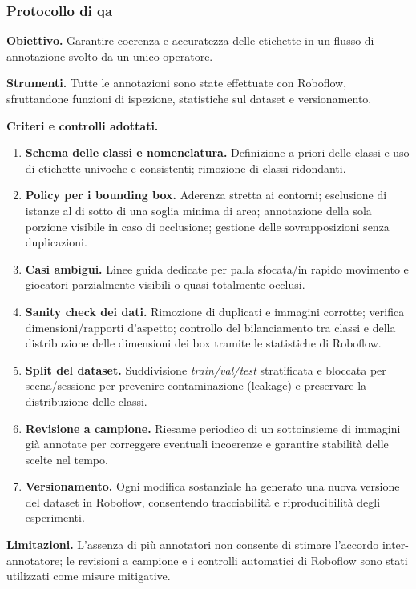\documentclass[12pt,a4paper,openright,twoside]{book}
\begin{document}
\subsubsection*{Protocollo di \ac{qa}}
\noindent\textbf{Obiettivo.} Garantire coerenza e accuratezza delle etichette in un flusso di annotazione svolto da 
un unico operatore.

\smallskip
\noindent\textbf{Strumenti.} Tutte le annotazioni sono state effettuate con Roboflow, sfruttandone funzioni di ispezione, statistiche sul dataset 
e versionamento.

\smallskip
\noindent\textbf{Criteri e controlli adottati.}
\begin{enumerate}[label=(\alph*)]
  \item \textbf{Schema delle classi e nomenclatura.} Definizione a priori delle classi e uso di etichette univoche e 
  consistenti; rimozione di classi ridondanti.
  \item \textbf{Policy per i bounding box.} Aderenza stretta ai contorni; esclusione di istanze al di sotto di una 
  soglia minima di area; annotazione della sola porzione visibile in caso di occlusione; gestione delle 
  sovrapposizioni senza duplicazioni.
  \item \textbf{Casi ambigui.} Linee guida dedicate per palla sfocata/in rapido movimento e giocatori parzialmente 
  visibili o quasi totalmente occlusi.
  \item \textbf{Sanity check dei dati.} Rimozione di duplicati e immagini corrotte; verifica dimensioni/rapporti 
  d'aspetto; controllo del bilanciamento tra classi e della distribuzione delle dimensioni dei box tramite le statistiche di Roboflow.
  \item \textbf{Split del dataset.} Suddivisione \emph{train/val/test} stratificata e bloccata per scena/sessione per prevenire contaminazione 
  (leakage) e preservare la distribuzione delle classi.
  \item \textbf{Revisione a campione.} Riesame periodico di un sottoinsieme di immagini già annotate per correggere eventuali incoerenze e 
  garantire stabilità delle scelte nel tempo.
  \item \textbf{Versionamento.} Ogni modifica sostanziale ha generato una nuova versione del dataset in Roboflow, consentendo tracciabilità e 
  riproducibilità degli esperimenti.
\end{enumerate}

\smallskip
\noindent\textbf{Limitazioni.} L'assenza di più annotatori non consente di stimare l'accordo inter-annotatore; le revisioni a campione 
e i controlli automatici di Roboflow sono stati utilizzati come misure mitigative.
\end{document}
